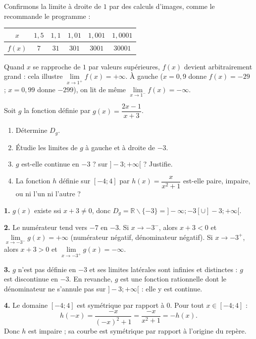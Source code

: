 \documentclass[11pt]{article}
\def\setminus{\mathbin{\backslash}}\let\smallsetminus\setminus
\begin{document}
\begin{exemplebox}
Confirmons la limite à droite de $1$ par des calculs d'images, comme le recommande le programme :
\begin{center}
\begin{tabular}{|c|ccccc|}\hline
$x$ & $1{,}5$ & $1{,}1$ & $1{,}01$ & $1{,}001$ & $1{,}0001$ \\ \hline
$f(x)$ & $7$ & $31$ & $301$ & $\num{3001}$ & $\num{30001}$ \\ \hline
\end{tabular}
\end{center}
Quand $x$ se rapproche de $1$ par valeurs supérieures, $f(x)$ devient arbitrairement grand : cela illustre $\lim\limits_{x \to 1^+} f(x) = +\infty$. À gauche ($x = 0{,}9$ donne $f(x) = -29$ ; $x = 0{,}99$ donne $-299$), on lit de même $\lim\limits_{x \to 1^-} f(x) = -\infty$.
\end{exemplebox}

\begin{exercice}
Soit $g$ la fonction définie par $g(x) = \dfrac{2x - 1}{x + 3}$.
\begin{enumerate}
\item Détermine $D_g$.
\item Étudie les limites de $g$ à gauche et à droite de $-3$.
\item $g$ est-elle continue en $-3$ ? sur $]-3 ; +\infty[$ ? Justifie.
\item La fonction $h$ définie sur $[-4 ; 4]$ par $h(x) = \dfrac{x}{x^2 + 1}$ est-elle paire, impaire, ou ni l'un ni l'autre ?
\end{enumerate}
\end{exercice}

\begin{corrige}
\textbf{1.} $g(x)$ existe ssi $x + 3 \neq 0$, donc $D_g = \mathbb{R} \setminus \{-3\} = ]-\infty ; -3[ \cup ]-3 ; +\infty[$.

\textbf{2.} Le numérateur tend vers $-7$ en $-3$. Si $x \to -3^-$, alors $x + 3 < 0$ et $\lim\limits_{x \to -3^-} g(x) = +\infty$ (numérateur négatif, dénominateur négatif). Si $x \to -3^+$, alors $x + 3 > 0$ et $\lim\limits_{x \to -3^+} g(x) = -\infty$.

\textbf{3.} $g$ n'est pas définie en $-3$ et ses limites latérales sont infinies et distinctes : $g$ est discontinue en $-3$. En revanche, $g$ est une fonction rationnelle dont le dénominateur ne s'annule pas sur $]-3 ; +\infty[$ : elle y est continue.

\textbf{4.} Le domaine $[-4 ; 4]$ est symétrique par rapport à $0$. Pour tout $x \in [-4 ; 4]$ :
\[ h(-x) = \frac{-x}{(-x)^2 + 1} = \frac{-x}{x^2 + 1} = -h(x). \]
Donc $h$ est impaire ; sa courbe est symétrique par rapport à l'origine du repère.
\end{corrige}
\end{document}
